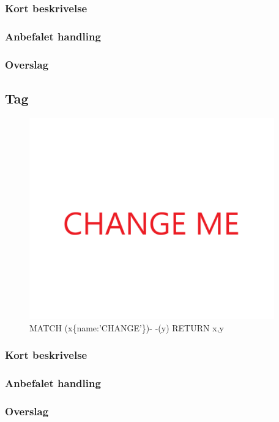 \documentclass{article}
\begin{document}
\subsubsection{Kort beskrivelse}
\subsubsection{Anbefalet handling}
\subsubsection{Overslag}
\subsection{Tag}
\begin{figure}[h]
\includegraphics[width=300pt]{CHANGE.PNG}
\caption{MATCH (x\{name:'CHANGE'\})- -(y) RETURN x,y}
\end{figure}
\subsubsection{Kort beskrivelse}
\subsubsection{Anbefalet handling}
\subsubsection{Overslag}
\end{document}
